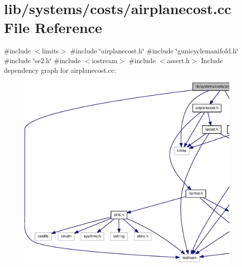 \section{lib/systems/costs/airplanecost.cc \-File \-Reference}
\label{airplanecost_8cc}
{\ttfamily \#include $<$limits$>$}\*
{\ttfamily \#include \char`\"{}airplanecost.\-h\char`\"{}}\*
{\ttfamily \#include \char`\"{}gunicyclemanifold.\-h\char`\"{}}\*
{\ttfamily \#include \char`\"{}se2.\-h\char`\"{}}\*
{\ttfamily \#include $<$iostream$>$}\*
{\ttfamily \#include $<$assert.\-h$>$}\*
\-Include dependency graph for airplanecost.\-cc\-:
\nopagebreak
\begin{figure}[H]
\begin{center}
\leavevmode
\includegraphics[width=350pt]{airplanecost_8cc__incl}
\end{center}
\end{figure}
